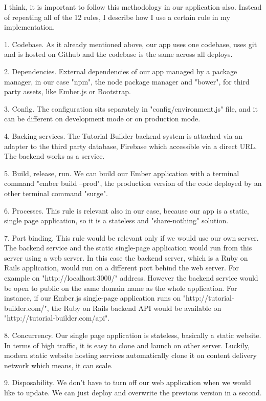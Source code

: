 \documentclass[11pt, a4paper, oneside, openright, medskipamount]{report}
\begin{document}
I think, it is important to follow this methodology in our application also. Instead of repeating all of the 12 rules, I describe how I use a certain rule in my implementation.

1. Codebase. As it already mentioned above, our app uses one codebase, uses git and is hosted on Github and the codebase is the same across all deploys.

2. Dependencies. External dependencies of our app managed by a package manager, in our case "npm", the node package manager and "bower", for third party assets, like Ember.js or Bootstrap.

3. Config. The configuration sits separately in "config/environment.js" file, and it can be different on development mode or on production mode.

4. Backing services. The Tutorial Builder backend system is attached via an adapter to the third party database, Firebase which accessible via a direct URL. The backend works as a service.

5. Build, release, run. We can build our Ember application with a terminal command "ember build --prod", the production version of the code deployed by an other terminal command "surge".

6. Processes. This rule is relevant also in our case, because our app is a static, single page application, so it is a stateless and "share-nothing" solution.

7. Port binding. This rule would be relevant only if we would use our own server. The backend service and the static single-page application would run from this server using a web server. In this case the backend server, which is a Ruby on Rails application, would run on a different port behind the web server. For example on "http://localhost:3000/" address. However the backend service would be open to public on the same domain name as the whole application. For instance, if our Ember.js single-page application runs on "http://tutorial-builder.com/", the Ruby on Rails backend API would be available on "http://tutorial-builder.com/api".

8. Concurrency. Our single page application is stateless, basically a static website. In terms of high traffic, it is easy to clone and launch on other server. Luckily, modern static website hosting services automatically clone it on content delivery network which means, it can scale.

9. Disposability. We don't have to turn off our web application when we would like to update. We can just deploy and overwrite the previous version in a second.
\end{document}
